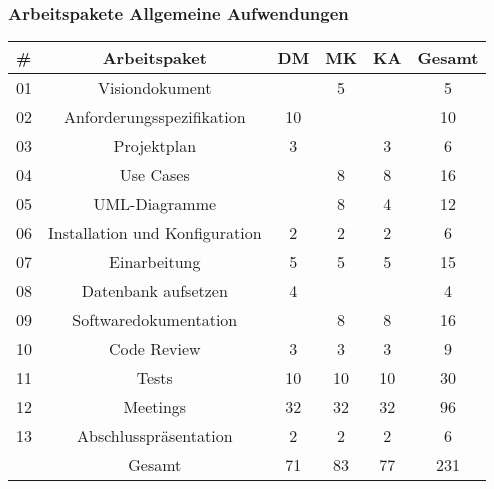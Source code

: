\documentclass[12pt,a4paper,onecolumn]{article}
\begin{document}
\subsubsection{Arbeitspakete Allgemeine Aufwendungen}
\begin{tabular}{|l|c|c|c|c|c|}
\hline
      \textbf{\#} & \textbf{Arbeitspaket} & \textbf{DM} & \textbf{MK} & \textbf{KA} &  \textbf{Gesamt} \\

\hline
01 & Visiondokument & & 5 & &  5\\
\hline
02 & Anforderungsspezifikation & 10 & & & 10\\
\hline
03 & Projektplan & 3 & & 3 &  6\\
\hline
04 & Use Cases & & 8 & 8 &   16 \\
\hline
05 & UML-Diagramme & & 8 & 4 &   12 \\
\hline
06 & Installation und Konfiguration & 2 & 2 & 2 &   6\\
\hline
07 & Einarbeitung & 5 & 5 & 5 &   15\\
\hline
08 & Datenbank aufsetzen & 4 & &  &  4\\
\hline
09 & Softwaredokumentation & & 8 & 8 &   16\\
\hline
10 & Code Review & 3 & 3 & 3 &   9\\
\hline
11 & Tests & 10 & 10  & 10 &  30\\
\hline
12 & Meetings & 32 & 32 & 32 &  96\\
\hline
13 & Abschlusspräsentation & 2 & 2 & 2 &   6\\
\hline
\hline
 & Gesamt & 71 & 83 & 77 &  231\\
\hline
\end{tabular}
\end{document}
